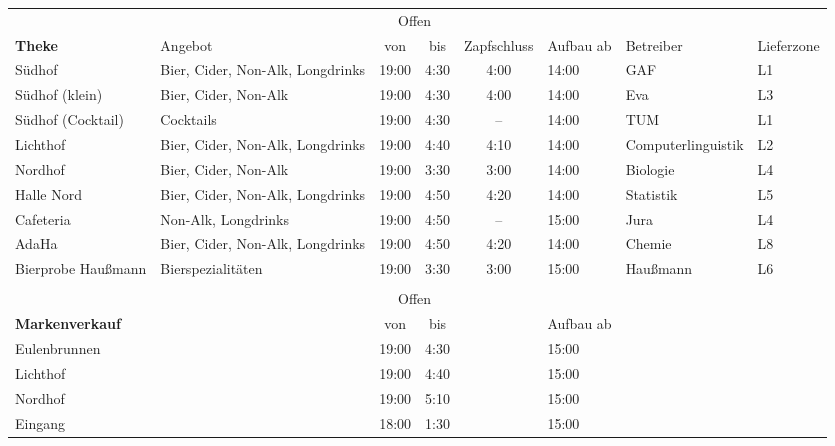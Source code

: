 \begin{center}
  \begin{tabular}{p{2cm}p{4cm}cccp{1.1cm}p{2cm}p{1cm}}
    & & \multicolumn{2}{c}{Offen} \\
    \multirow{-2}{*}{\textbf{Theke}} & \multirow{-2}{*}{Angebot} & von & bis & \multirow{-2}{*}{\parbox{1cm}{Zapf\-schluss}} & \multirow{-2}{*}{\parbox{1cm}{Aufbau ab}} & \multirow{-2}{*}{Betreiber} & \multirow{-2}{*}{\parbox{1cm}{Liefer\-zone}} \\ \hline \hline
    Südhof & Bier, Cider, Non-Alk, Longdrinks & 19:00 & 4:30 & 4:00 & 14:00 & GAF & L1 \\ \hline
    Südhof (klein) & Bier, Cider, Non-Alk & 19:00 & 4:30 & 4:00 & 14:00 & Eva & L3 \\ \hline
    Südhof (Cocktail) & Cocktails & 19:00 & 4:30 & -- & 14:00 & TUM & L1 \\ \hline
    Lichthof & Bier, Cider, Non-Alk, Longdrinks & 19:00 & 4:40 & 4:10 & 14:00 & Computer\-linguistik & L2 \\ \hline
    Nordhof & Bier, Cider, Non-Alk & 19:00 & 3:30 & 3:00 & 14:00 & Biologie & L4 \\ \hline
    Halle Nord & Bier, Cider, Non-Alk, Longdrinks & 19:00 & 4:50 & 4:20 & 14:00 & Statistik & L5 \\ \hline
    Cafeteria & Non-Alk, Longdrinks & 19:00 & 4:50 & -- & 15:00 & Jura & L4 \\ \hline %
    AdaHa & Bier, Cider, Non-Alk, Longdrinks & 19:00 & 4:50 & 4:20 & 14:00 & Chemie & L8 \\ \hline
    Bierprobe Haußmann & Bierspezialitäten & 19:00 & 3:30 & 3:00 & 15:00 & Haußmann & L6 \\ \\
                        & & \multicolumn{2}{c}{Offen} \\
    \multirow{-2}{*}{\textbf{Markenverkauf}} & & von & bis & & \multirow{-2}{*}{\parbox{1cm}{Aufbau ab}} \\ \hline \hline
    Eulenbrunnen & & 19:00 & 4:30 & & 15:00 \\
    Lichthof & & 19:00 & 4:40 & & 15:00 \\
    Nordhof & & 19:00 & 5:10 & & 15:00 \\
    Eingang & & 18:00 & 1:30 & & 15:00
  \end{tabular}
\end{center}
